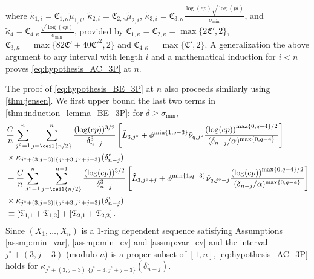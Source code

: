 \documentclass[aos]{imsart}
\begin{document}
\begin{appendix}
where $\tilde\kappa_{1,i} = \mathfrak{C}_{1,\kappa} \tilde\mu_{1,i}$, 
$\tilde\kappa_{2,i} = \mathfrak{C}_{2,\kappa} \tilde\mu_{2,i}$, 
$\tilde\kappa_{3,i} = \mathfrak{C}_{3,\kappa} \frac{\log(ep)\sqrt{\log(pi)}}{\sigma_{\min}}$, and
$\tilde\kappa_{4} = \mathfrak{C}_{4,\kappa} \frac{\sqrt{\log(ep)}}{\sigma_{\min}}$, provided by $\mathfrak{C}_{1,\kappa} = \mathfrak{C}_{2,\kappa} = \max\{2 \mathfrak{C}', 2\}$, $\mathfrak{C}_{3,\kappa} = \max\{82 \mathfrak{C}' + 40 \mathfrak{C}'^2, 2\}$ and $\mathfrak{C}_{4,\kappa} = \max\{ \mathfrak{C}', 2\}$. 
A generalization the above argument to any interval with length $i$ and a mathematical induction for $i < n$ proves \eqref{eq:hypothesis_AC_3P} at $n$.

\medskip

The proof of \eqref{eq:hypothesis_BE_3P} at $n$ also proceeds similarly using \cref{thm:jensen}. 
%
We first upper bound the last two terms in \cref{thm:induction_lemma_BE_3P}: for $\delta \geq \sigma_{\min}$,
\begin{equation*}
\begin{aligned}
    & \frac{C}{n} \sum_{j^\circ=1}^n \sum_{j=\ceil{n/2}}^{n} \frac{(\log(ep))^{3/2}}{\delta_{n-j}^3}
    \left[ 
        \tilde{L}_{3,j^\circ}
        + \phi^{\min\{1, q-3\}} \tilde\nu_{q,j^\circ} \frac{ {(\log(ep))}^{\max\{0, q-4\}/2}}{(\delta_{n-j}/\alpha)^{\max\{0, q-4\}}}
    \right] \\
    & \times \kappa_{j^\circ+(3,j-3)|\{j^\circ+3,j^\circ+j-3\}}(\delta_{n-j}^\circ) \\
    & + \frac{C}{n} \sum_{j^\circ=1}^n \sum_{j=\ceil{n/2}}^{n-1} \frac{(\log(ep))^{3/2}}{\delta_{n-j}^3}
    \left[ 
        \tilde{L}_{3,j^\circ+j}
        + \phi^{\min\{1, q-3\}} \tilde\nu_{q,j^\circ+j} \frac{ {(\log(ep))}^{\max\{0, q-4\}/2}}{(\delta_{n-j}/\alpha)^{\max\{0, q-4\}}}
    \right] \\
    &\times \kappa_{j^\circ+(3,j-3)|\{j^\circ+3,j^\circ+j-3\}}(\delta_{n-j}^\circ) \\
    & \equiv \left[ \mathfrak{T}_{1,1} + \mathfrak{T}_{1,2} \right] 
    + \left[ \mathfrak{T}_{2,1} + \mathfrak{T}_{2,2} \right].
\end{aligned}
\end{equation*}
Since $(X_1, \dots, X_n)$ is a $1$-ring dependent sequence satisfying Assumptions \eqref{assmp:min_var}, \eqref{assmp:min_ev} and \eqref{assmp:var_ev} and the interval $j^\circ+(3,j-3)$ (modulo $n$) is a proper subset of $[1,n]$, \eqref{eq:hypothesis_AC_3P} holds for $\kappa_{j^\circ+(3,j-3)|\{j^\circ+3, j^\circ+j-3\}}(\delta_{n-j}^\circ)$.

\end{appendix}
\end{document}
